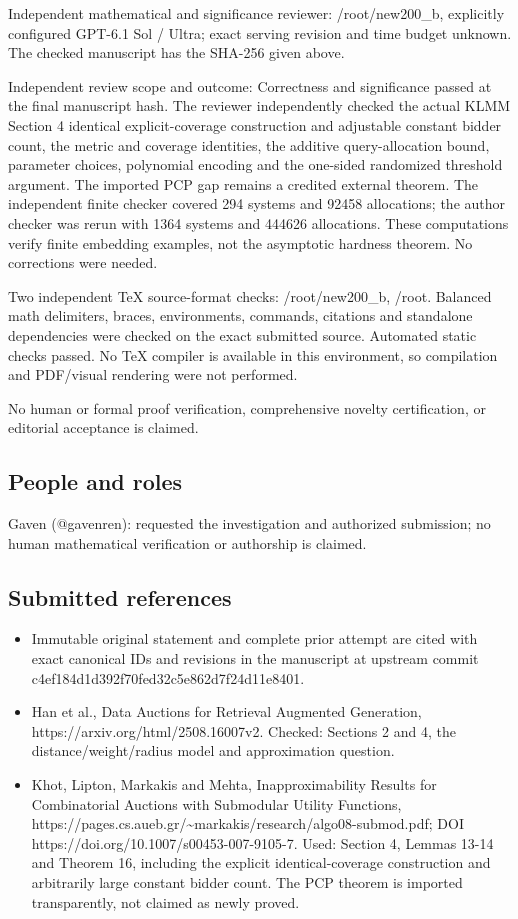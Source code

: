 \documentclass[11pt]{article}
\begin{document}
Independent mathematical and significance reviewer: /root/new200\_b, explicitly configured GPT-6.1 Sol / Ultra; exact serving revision and time budget unknown. The checked manuscript has the SHA-256 given above.

Independent review scope and outcome: Correctness and significance passed at the final manuscript hash. The reviewer independently checked the actual KLMM Section 4 identical explicit-coverage construction and adjustable constant bidder count, the metric and coverage identities, the additive query-allocation bound, parameter choices, polynomial encoding and the one-sided randomized threshold argument. The imported PCP gap remains a credited external theorem. The independent finite checker covered 294 systems and 92458 allocations; the author checker was rerun with 1364 systems and 444626 allocations. These computations verify finite embedding examples, not the asymptotic hardness theorem. No corrections were needed.

Two independent TeX source-format checks: /root/new200\_b, /root. Balanced math delimiters, braces, environments, commands, citations and standalone dependencies were checked on the exact submitted source. Automated static checks passed. No TeX compiler is available in this environment, so compilation and PDF/visual rendering were not performed.

No human or formal proof verification, comprehensive novelty certification, or editorial acceptance is claimed.

\subsection{People and roles}

Gaven (@gavenren): requested the investigation and authorized submission; no human mathematical verification or authorship is claimed.

\subsection{Submitted references}

\begin{itemize}
\item
  Immutable original statement and complete prior attempt are cited with exact canonical IDs and revisions in the manuscript at upstream commit c4ef184d1d392f70fed32c5e862d7f24d11e8401.
\item
  Han et al., Data Auctions for Retrieval Augmented Generation, https://arxiv.org/html/2508.16007v2. Checked: Sections 2 and 4, the distance/weight/radius model and approximation question.
\item
  Khot, Lipton, Markakis and Mehta, Inapproximability Results for Combinatorial Auctions with Submodular Utility Functions, https://pages.cs.aueb.gr/\textasciitilde markakis/research/algo08-submod.pdf; DOI https://doi.org/10.1007/s00453-007-9105-7. Used: Section 4, Lemmas 13-14 and Theorem 16, including the explicit identical-coverage construction and arbitrarily large constant bidder count. The PCP theorem is imported transparently, not claimed as newly proved.
\end{itemize}
\end{document}
